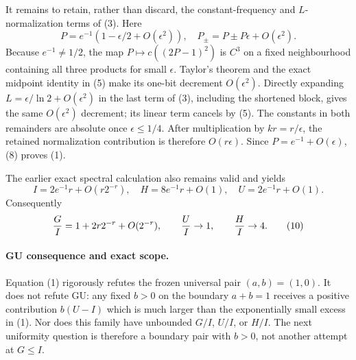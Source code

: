 It remains to retain, rather than discard, the constant-frequency and
$L$-normalization terms of (3).  Here
\[
 P=e^{-1}(1-\epsilon/2+O(\epsilon^2)),\quad
 P_\pm=P\pm P\epsilon+O(\epsilon^2).
\]
Because $e^{-1}\ne1/2$, the map $P\mapsto c((2P-1)^2)$ is $C^3$ on a
fixed neighbourhood containing all three products for small $\epsilon$.
Taylor's theorem and the exact midpoint identity in (5) make its one-bit
decrement $O(\epsilon^2)$.  Directly expanding
$L=\epsilon/\ln2+O(\epsilon^2)$ in the last term of (3), including the
shortened block, gives the same $O(\epsilon^2)$ decrement; its linear term
cancels by (5).  The constants in both remainders are absolute once
$\epsilon\le1/4$.  After multiplication by $kr=r/\epsilon$, the retained
normalization contribution is therefore $O(r\epsilon)$.  Since
$P=e^{-1}+O(\epsilon)$, (8) proves (1).

The earlier exact spectral calculation also remains valid and yields
\[
 I=2e^{-1}r+O(r2^{-r}),\quad
 H=8e^{-1}r+O(1),\quad U=2e^{-1}r+O(1).                 \tag{9}
\]
Consequently
\[
 {G\over I}=1+2r2^{-r}+O(2^{-r}),\qquad
 {U\over I}\to1,\qquad {H\over I}\to4.               \tag{10}
\]

\paragraph{GU consequence and exact scope.}
Equation (1) rigorously refutes the frozen universal pair $(a,b)=(1,0)$.
It does not refute GU: any fixed $b>0$ on the boundary $a+b=1$ receives a
positive contribution $b(U-I)$ which is much larger than the exponentially
small excess in (1).  Nor does this family have unbounded $G/I$, $U/I$, or
$H/I$.  The next uniformity question is therefore a boundary pair with
$b>0$, not another attempt at $G\le I$.

